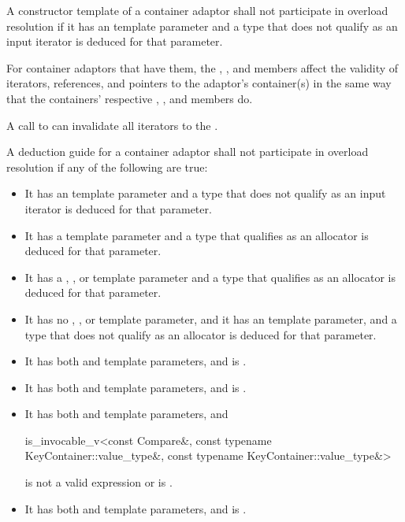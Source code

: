 \pnum
A constructor template of a container adaptor
shall not participate in overload resolution
if it has an  template parameter and
a type that does not qualify as an input iterator is deduced for that parameter.

\pnum
For container adaptors that have them,
the , , and  members
affect the validity of iterators, references, and pointers
to the adaptor's container(s) in the same way that
the containers' respective
, , and  members do.
\begin{example}
A call to 
can invalidate all iterators to the .
\end{example}

\pnum
A deduction guide for a container adaptor shall not participate in overload resolution if any of the following are true:
\begin{itemize}
\item It has an  template parameter and a type that does not qualify as an input iterator is deduced for that parameter.
\item It has a  template parameter and a type that qualifies as an allocator is deduced for that parameter.
\item It has a , , or  template parameter and a type that qualifies as an allocator is deduced for that parameter.
\item It has no , , or  template parameter, and it has an  template parameter, and a type that does not qualify as an allocator is deduced for that parameter.
\item It has both  and  template parameters, and  is .
\item It has both  and  template parameters, and
 is .
\item It has both  and  template parameters, and
\begin{codeblock}
is_invocable_v<const Compare&,
              const typename KeyContainer::value_type&,
              const typename KeyContainer::value_type&>
\end{codeblock}
is not a valid expression or is .
\item It has both  and  template parameters, and
 is .
\end{itemize}

